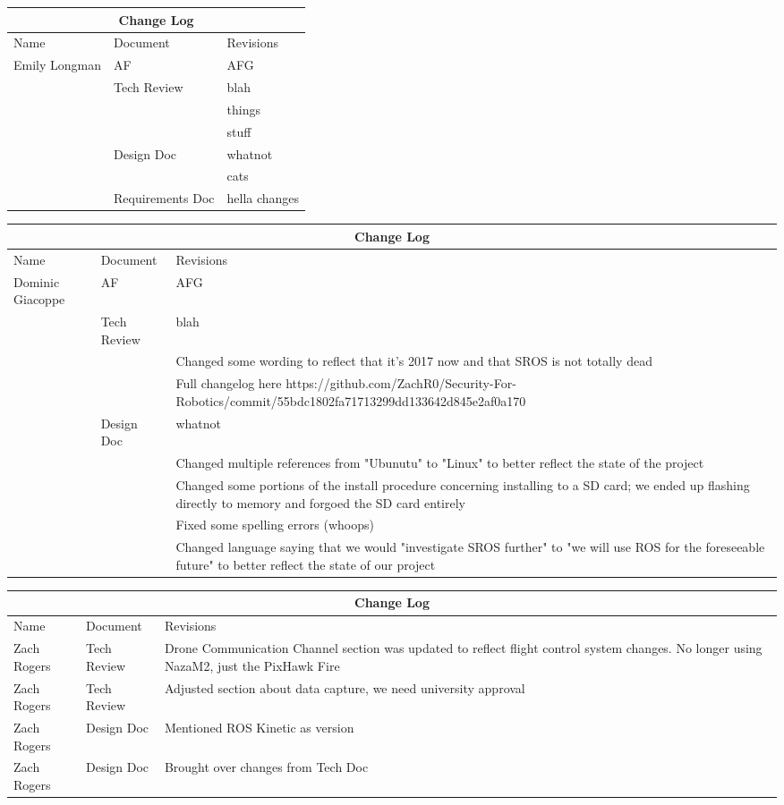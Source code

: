 \documentclass[IEEEtran,letterpaper,10pt,titlepage,draftclsnofoot,onecolumn]{article}
\begin{document}
\begin{tabular}{ |p{3cm}|p{3cm}|p{3cm}|  }
\hline
\multicolumn{3}{|c|}{Change Log} \\
\hline
Name & Document & Revisions \\
\hline
Emily Longman & AF &AFG \\
& Tech Review & blah \\
& & things \\
& & stuff \\
& Design Doc & whatnot \\
& & cats \\
& Requirements Doc & hella changes \\
\hline
\end{tabular}

\begin{tabular}{ |p{3cm}|p{3cm}|p{3cm}|  }
\hline
\multicolumn{3}{|c|}{Change Log} \\
\hline
Name & Document & Revisions \\
\hline
Dominic Giacoppe & AF &AFG \\
& Tech Review & blah \\
& & Changed some wording to reflect that it's 2017 now and that SROS is not totally dead \\
& & Full changelog here https://github.com/ZachR0/Security-For-Robotics/commit/55bdc1802fa71713299dd133642d845e2af0a170 \\
& Design Doc & whatnot \\
& & Changed multiple references from "Ubunutu" to "Linux" to better reflect the state of the project \\
& & Changed some portions of the install procedure concerning installing to a SD card; we ended up flashing directly to memory and forgoed the SD card entirely \\
& & Fixed some spelling errors (whoops) \\
& & Changed language saying that we would "investigate SROS further" to "we will use ROS for the foreseeable future" to better reflect the state of our project \\
\hline
\end{tabular}

\begin{tabular}{ |p{3cm}|p{3cm}|p{3cm}|  }
\hline
\multicolumn{3}{|c|}{Change Log} \\
\hline
Name & Document & Revisions \\
\hline
Zach Rogers & Tech Review & Drone Communication Channel section was updated to reflect flight control system changes. No longer using NazaM2, just the PixHawk Fire \\
Zach Rogers & Tech Review & Adjusted section about data capture, we need university approval \\
Zach Rogers & Design Doc & Mentioned ROS Kinetic as version \\
Zach Rogers & Design Doc & Brought over changes from Tech Doc \\
\hline
\end{tabular}
\end{document}
